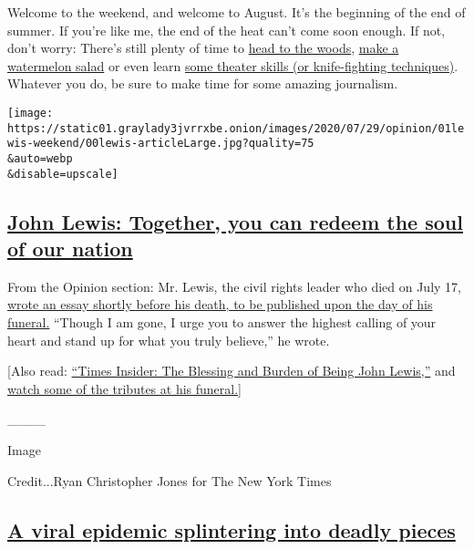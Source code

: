 Welcome to the weekend, and welcome to August. It's the beginning of the
end of summer. If you're like me, the end of the heat can't come soon
enough. If not, don't worry: There's still plenty of time to
\href{https://www.nytimes3xbfgragh.onion/2020/07/29/at-home/newsletter.html}{head
to the woods},
\href{https://www.nytimes3xbfgragh.onion/2020/07/29/dining/watermelon-salad-recipe.html}{make
a watermelon salad} or even learn
\href{https://www.nytimes3xbfgragh.onion/2020/07/30/theater/theater-classes-at-home.html}{some
theater skills (or knife-fighting techniques)}. Whatever you do, be sure
to make time for some amazing journalism.

\texttt{[image: https://static01.graylady3jvrrxbe.onion/images/2020/07/29/opinion/01lewis-weekend/00lewis-articleLarge.jpg?quality=75\\\&auto=webp\\\&disable=upscale]}

\hypertarget{john-lewis-together-you-can-redeem-the-soul-of-our-nation}{%
\subsection{\texorpdfstring{\href{https://www.nytimes3xbfgragh.onion/2020/07/30/opinion/john-lewis-civil-rights-america.html}{John
Lewis: Together, you can redeem the soul of our
nation}}{John Lewis: Together, you can redeem the soul of our nation}}\label{john-lewis-together-you-can-redeem-the-soul-of-our-nation}}

From the Opinion section: Mr. Lewis, the civil rights leader who died on
July 17,
\href{https://www.nytimes3xbfgragh.onion/2020/07/30/opinion/john-lewis-civil-rights-america.html}{wrote
an essay shortly before his death, to be published upon the day of his
funeral.} ``Though I am gone, I urge you to answer the highest calling
of your heart and stand up for what you truly believe,'' he wrote.

{[}Also read:
\href{https://www.nytimes3xbfgragh.onion/2020/07/23/insider/john-lewis-memory.html}{``Times
Insider: The Blessing and Burden of Being John Lewis,''} and
\href{https://www.nytimes3xbfgragh.onion/video/us/politics/100000007264823/john-lewis-funeral.html}{watch
some of the tributes at his funeral.}{]}

\_\_\_\_

Image

Credit...Ryan Christopher Jones for The New York Times

\hypertarget{a-viral-epidemic-splintering-into-deadly-pieces}{%
\subsection{\texorpdfstring{\href{https://www.nytimes3xbfgragh.onion/2020/07/29/health/coronavirus-future-america.html}{A
viral epidemic splintering into deadly
pieces}}{A viral epidemic splintering into deadly pieces}}\label{a-viral-epidemic-splintering-into-deadly-pieces}}

